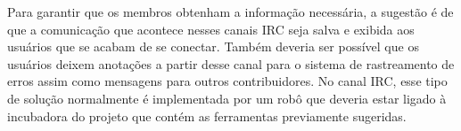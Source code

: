 Para garantir que os membros obtenham a informação necessária, a
sugestão é de que a comunicação que acontece nesses canais IRC seja
salva e exibida aos usuários que se acabam de se conectar. Também
deveria ser possível que os usuários deixem anotações a partir desse
canal para o sistema de rastreamento de erros assim como mensagens
para outros contribuidores. No canal IRC, esse tipo de solução
normalmente é implementada por um robô que deveria estar ligado à
incubadora do projeto que contém as ferramentas previamente sugeridas.

